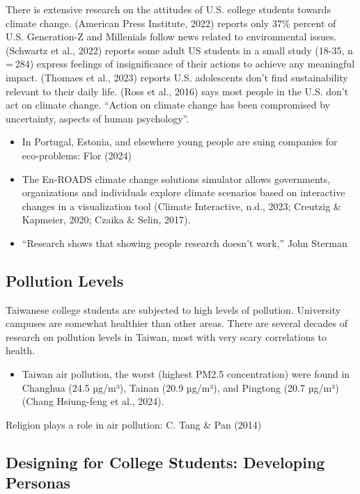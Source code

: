 \documentclass[
  letterpaper,
  DIV=11,
  numbers=noendperiod]{scrartcl}
\providecommand{\tightlist}{%
  \setlength{\itemsep}{0pt}\setlength{\parskip}{0pt}}\usepackage{longtable,booktabs,array}
\begin{document}
There is extensive research on the attitudes of U.S. college students
towards climate change. (American Press Institute, 2022) reports only
37\% percent of U.S. Generation-Z and Millenials follow news related to
environmental issues. (Schwartz et al., 2022) reports some adult US
students in a small study (18-35, n = 284) express feelings of
insignificance of their actions to achieve any meaningful impact.
(Thomaes et al., 2023) reports U.S. adolescents don't find
sustainability relevant to their daily life. (Ross et al., 2016) says
most people in the U.S. don't act on climate change. ``Action on climate
change has been compromised by uncertainty, aspects of human
psychology''.

\begin{itemize}
\item
  In Portugal, Estonia, and elsewhere young people are suing companies
  for eco-problems: Flor (2024)
\item
  The En-ROADS climate change solutions simulator allows governments,
  organizations and individuals explore climate scenarios based on
  interactive changes in a visualization tool (Climate Interactive,
  n.d., 2023; Creutzig \& Kapmeier, 2020; Czaika \& Selin, 2017).
\item
  ``Research shows that showing people research doesn't work,'' John
  Sterman
\end{itemize}

\subsection{Pollution Levels}\label{pollution-levels}

Taiwanese college students are subjected to high levels of pollution.
University campuses are somewhat healthier than other areas. There are
several decades of research on pollution levels in Taiwan, most with
very scary correlations to health.

\begin{itemize}
\tightlist
\item
  Taiwan air pollution, the worst (highest PM2.5 concentration) were
  found in Changhua (24.5 µg/m³), Tainan (20.9 µg/m³), and Pingtong
  (20.7 µg/m³) (Chang Hsiung-feng et al., 2024).
\end{itemize}

Religion plays a role in air pollution: C. Tang \& Pan (2014)

\subsection{Designing for College Students: Developing
Personas}\label{designing-for-college-students-developing-personas}
\end{document}
